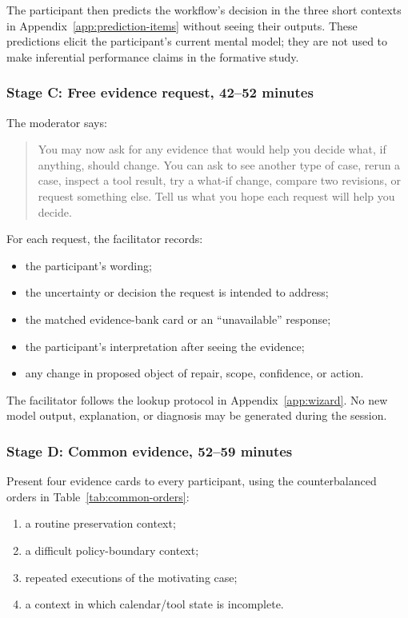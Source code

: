 The participant then predicts the workflow's decision in the three short
contexts in Appendix~\ref{app:prediction-items} without seeing their outputs.
These predictions elicit the participant's current mental model; they are not
used to make inferential performance claims in the formative study.

\subsubsection{Stage C: Free evidence request, 42--52 minutes}

The moderator says:

\begin{quote}
You may now ask for any evidence that would help you decide what, if anything,
should change. You can ask to see another type of case, rerun a case, inspect a
tool result, try a what-if change, compare two revisions, or request something
else. Tell us what you hope each request will help you decide.
\end{quote}

For each request, the facilitator records:

\begin{itemize}[leftmargin=*]
    \item the participant's wording;
    \item the uncertainty or decision the request is intended to address;
    \item the matched evidence-bank card or an ``unavailable'' response;
    \item the participant's interpretation after seeing the evidence;
    \item any change in proposed object of repair, scope, confidence, or action.
\end{itemize}

The facilitator follows the lookup protocol in Appendix~\ref{app:wizard}. No
new model output, explanation, or diagnosis may be generated during the
session.

\subsubsection{Stage D: Common evidence, 52--59 minutes}

Present four evidence cards to every participant, using the counterbalanced
orders in Table~\ref{tab:common-orders}:

\begin{enumerate}[leftmargin=*]
    \item a routine preservation context;
    \item a difficult policy-boundary context;
    \item repeated executions of the motivating case;
    \item a context in which calendar/tool state is incomplete.
\end{enumerate}

